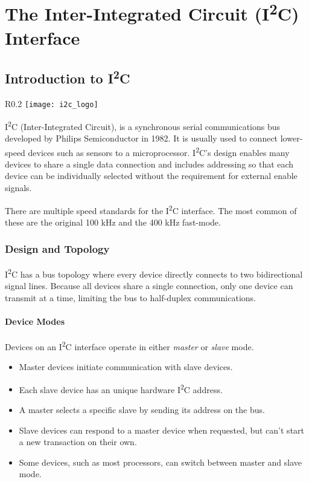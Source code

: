 \documentclass[openany,11pt,fleqn]{book} %
\begin{document}
	
\chapter{The Inter-Integrated Circuit (I\textsuperscript{2}C) Interface}

\section{Introduction to I\textsuperscript{2}C}
    \begin{wrapfigure}{R}{0.2\textwidth}
        \centering\texttt{[image: i2c\_logo]}
    \end{wrapfigure}

    I\textsuperscript{2}C (Inter-Integrated Circuit), is a synchronous serial communications bus developed by Philips Semiconductor in 1982. It is usually used to connect lower-speed devices such as sensors to a microprocessor. I\textsuperscript{2}C's design enables many devices to share a single data connection and includes addressing so that each device can be individually selected without the requirement for external enable signals.
    
    There are multiple speed standards for the  I\textsuperscript{2}C interface. The most common of these are the original 100 kHz and the 400 kHz fast-mode.

    \subsection{Design and Topology}
            I\textsuperscript{2}C has a bus topology where every device directly connects to two bidirectional signal lines. Because all devices share a single connection, only one device can transmit at a time, limiting the bus to half-duplex communications. 

            \subsubsection{Device Modes}
            Devices on an I\textsuperscript{2}C interface operate in either \textit{master} or \textit{slave} mode. 
            \begin{itemize}
                \item Master devices initiate communication with slave devices.
                \item Each slave device has an unique hardware I\textsuperscript{2}C address.
                \item A master selects a specific slave by sending its address on the bus.
                \item Slave devices can respond to a master device when requested, but can't start a new transaction on their own.
                \item Some devices, such as most processors, can switch between master and slave mode.
            \end{itemize}
        
\end{document}
